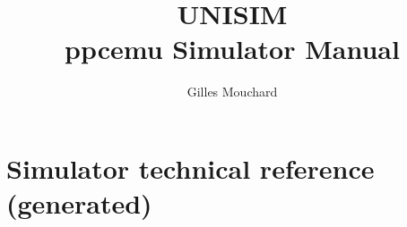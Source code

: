 \documentclass[a4paper,11pt]{article}
\begin{document}
\title{UNISIM\\ ppcemu Simulator Manual}
\author{Gilles Mouchard}
\date{}

\maketitle

\section{Simulator technical reference (generated)}

\end{document}
